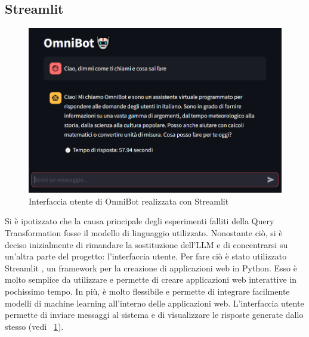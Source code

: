 \subsection{Streamlit}
\begin{figure}[!t]
    \centering
    \includegraphics[width=\textwidth]{Images/cap4/streamlit.PNG}
    \caption{Interfaccia utente di OmniBot realizzata con Streamlit}
    \label{fig:streamlit}
\end{figure}
Si è ipotizzato che la causa principale degli esperimenti falliti della Query Transformation fosse il modello di linguaggio utilizzato. Nonostante ciò, si è deciso inizialmente di rimandare la sostituzione dell'LLM e di concentrarsi su un'altra parte del progetto: l'interfaccia utente. Per fare ciò è stato utilizzato Streamlit \cite{streamlit}, un framework per la creazione di applicazioni web in Python. Esso è molto semplice da utilizzare e permette di creare applicazioni web interattive in pochissimo tempo. In più, è molto flessibile e permette di integrare facilmente modelli di machine learning all'interno delle applicazioni web. L'interfaccia utente permette di inviare messaggi al sistema e di visualizzare le risposte generate dallo stesso (vedi \figurename{~\ref{fig:streamlit}}).

